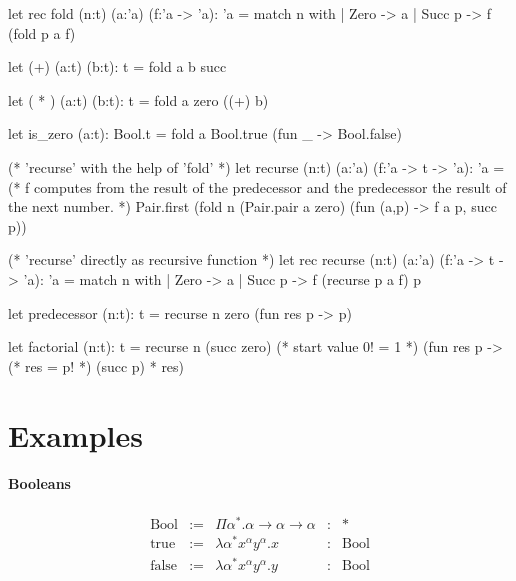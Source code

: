 \begin{ocaml}
  let rec fold (n:t) (a:'a) (f:'a -> 'a): 'a =
    match n with
    | Zero -> a
    | Succ p -> f (fold p a f)
\end{ocaml}

\begin{ocaml}
  let (+) (a:t) (b:t): t =
    fold a b succ
\end{ocaml}

\begin{ocaml}
  let ( * ) (a:t) (b:t): t =
    fold a zero ((+) b)
\end{ocaml}


\begin{ocaml}
  let is_zero (a:t): Bool.t =
    fold a Bool.true (fun _ -> Bool.false)
\end{ocaml}


\begin{ocaml}
  (* 'recurse' with the help of 'fold' *)
  let recurse (n:t) (a:'a) (f:'a -> t -> 'a): 'a =
    (* f computes from the result of the predecessor and the predecessor
       the result of the next number. *)
    Pair.first (fold n (Pair.pair a zero) (fun (a,p) -> f a p, succ p))

  (* 'recurse' directly as recursive function *)
  let rec recurse (n:t) (a:'a) (f:'a -> t -> 'a): 'a =
    match n with
    | Zero -> a
    | Succ p -> f (recurse p a f) p
\end{ocaml}

\begin{ocaml}
  let predecessor (n:t): t =
    recurse n zero (fun res p -> p)
\end{ocaml}

\begin{ocaml}
  let factorial (n:t): t =
    recurse
      n
      (succ zero)     (* start value 0! = 1 *)
      (fun res p ->   (* res = p! *)
         (succ p) * res)
\end{ocaml}




\section{Examples}


\paragraph{Booleans}
$$
\begin{array}{lllll}
  \text{Bool}
  &:=& \Pi \alpha^* . \alpha\to\alpha\to\alpha
  &:& *
  \\
  \text{true}
  &:=& \lambda \alpha^* x^\alpha y^\alpha . x
  &:& \text{Bool}
  \\
  \text{false}
  &:=& \lambda \alpha^* x^\alpha y^\alpha . y
  &:& \text{Bool}
\end{array}
$$



